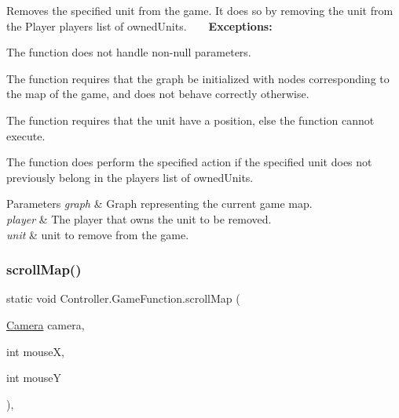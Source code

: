Removes the specified unit from the game. It does so by removing the unit from the Player player\textquotesingle{}s list of owned\+Units. ~\newline
~\newline
 {\bfseries Exceptions\+:} ~\newline

\begin{DoxyItemize}
\item The function does not handle non-\/null parameters.
\item The function requires that the graph be initialized with nodes corresponding to the map of the game, and does not behave correctly otherwise.
\item The function requires that the unit have a position, else the function cannot execute.
\item The function does perform the specified action if the specified unit does not previously belong in the player\textquotesingle{}s list of owned\+Units. 
\begin{DoxyParams}{Parameters}
{\em graph} & Graph representing the current game map. \\
\hline
{\em player} & The player that owns the unit to be removed. \\
\hline
{\em unit} & unit to remove from the game. \\
\hline
\end{DoxyParams}

\end{DoxyItemize}\hypertarget{class_controller_1_1_game_function_a96148c53d564690b5cd207281fc5c0ef}{}\label{class_controller_1_1_game_function_a96148c53d564690b5cd207281fc5c0ef} 
\subsubsection{\texorpdfstring{scroll\+Map()}{scrollMap()}}
{\footnotesize\ttfamily static void Controller.\+Game\+Function.\+scroll\+Map (\begin{DoxyParamCaption}\item[{\hyperlink{class_view_1_1_camera}{Camera}}]{camera,  }\item[{int}]{mouseX,  }\item[{int}]{mouseY }\end{DoxyParamCaption})\hspace{0.3cm}{\ttfamily [inline]}, {\ttfamily [static]}}

